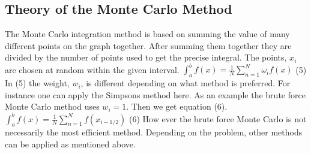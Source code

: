 \documentclass{article}
\begin{document}
\subsection{Theory of the Monte Carlo Method}

The Monte Carlo integration method is based on summing the value of many different points on the graph together. After summing them together they are divided by the number of points used to get the precise integral. The points, $x_i$ are chosen at random within the given interval.   
\newline
\newline
$\int_{a}^{b} f(x) = \frac{1}{N} \sum_{n=1}^{N} \omega_if(x) $ (5)
\newline
\newline
In (5) the weight, $w_i$, is different depending on what method is preferred. For instance one can apply the Simpsons method here. As an example the brute force Monte Carlo method uses $w_i = 1$. Then we get equation (6).
\newline
\newline
$\int_{a}^{b} f(x) = \frac{1}{N} \sum_{n=1}^{N} f(x_{i-1/2}) $ (6)
\newline
\newline
How ever the brute force Monte Carlo is not necessarily the most efficient method. Depending on the problem, other methods can be applied as mentioned above.












 
\end{document}
